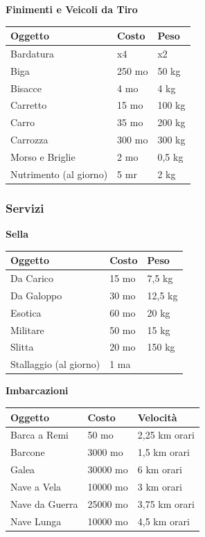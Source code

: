 \begin{multicols}{2}
\medskip

\textbf{Finimenti e Veicoli da Tiro}\label{Veicoli}\hypertarget{Veicoli}{}

\noindent\begin{tabularx}{\linewidth}{Xll}
\toprule
\textbf{Oggetto}&\textbf{Costo}&\textbf{Peso}\\
\toprule
Bardatura&x4&x2\\
Biga&250 mo&50 kg\\
Bisacce&4 mo&4 kg\\
Carretto&15 mo&100 kg\\
Carro&35 mo&200 kg\\
Carrozza&300 mo&300 kg\\
Morso e Briglie&2 mo&0,5 kg\\
Nutrimento (al giorno)&5 mr&2 kg
\end{tabularx}



\subsubsection{Servizi}

\textbf{Sella}

\noindent\begin{tabularx}{\linewidth}{Xll}
\toprule
\textbf{Oggetto}&\textbf{Costo}&\textbf{Peso}\\
\toprule
Da Carico&15 mo&7,5 kg\\
Da Galoppo&30 mo&12,5 kg\\
Esotica&60 mo&20 kg\\
Militare&50 mo&15 kg\\
Slitta&20 mo&150 kg\\
Stallaggio (al giorno)&1 ma&
\end{tabularx}

\medskip

\textbf{Imbarcazioni}\hypertarget{Imbarcazioni}{}

\noindent\begin{tabularx}{\linewidth}{Xll}
\toprule
\textbf{Oggetto}&\textbf{Costo}&\textbf{Velocità}\\
\toprule
Barca a Remi&50 mo&2,25 km orari\\
Barcone&3000 mo&1,5 km orari\\
Galea&30000 mo&6 km orari\\
Nave a Vela&10000 mo&3 km orari\\
Nave da Guerra&25000 mo&3,75 km orari\\
Nave Lunga&10000 mo&4,5 km orari
\end{tabularx}


\end{multicols}
